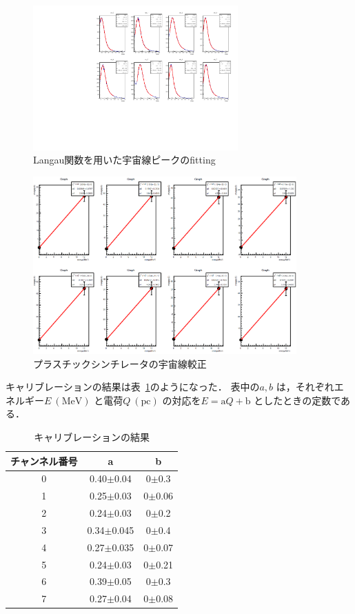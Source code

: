 \begin{figure}[H]
  \centering
  \includegraphics[width=0.7\textwidth,angle=-90]{figure/tajima/fit_langau.pdf}
  \caption{Langau関数を用いた宇宙線ピークのfitting}\label{ps_langau}
\end{figure} 
\begin{figure}[H]
  \centering
  \includegraphics[width=0.9\textwidth]{figure/tajima/fit_calibline.png}
  \caption{プラスチックシンチレータの宇宙線較正}\label{ps_cali}
\end{figure}

 キャリブレーションの結果は表~\ref{PS_calib_table}のようになった．
 表中の$a ,b$ は，それぞれエネルギー$E~(\mathrm{MeV })$ と電荷$Q~(\mathrm{pc })$ の対応を$E = \mathrm{a} Q + \mathrm{b}$ としたときの定数である．
 \begin{table}[h]
  \caption{キャリブレーションの結果}
  \label{PS_calib_table}
  \begin{center}
   \begin{tabular}{ccc}\toprule
    チャンネル番号&a &b \\ \hline
    0& 0.40$\pm$0.04 &0$\pm$0.3 \\
    1& 0.25$\pm$0.03 &0$\pm$0.06 \\
    2& 0.24$\pm$0.03 &0$\pm$0.2 \\
    3& 0.34$\pm$0.045 &0$\pm$0.4 \\
    4& 0.27$\pm$0.035 &0$\pm$0.07 \\
    5& 0.24$\pm$0.03 &0$\pm$0.21 \\
    6& 0.39$\pm$0.05 &0$\pm$0.3 \\
    7& 0.27$\pm$0.04 &0$\pm$0.08 \\ \bottomrule
   \end{tabular}
  \end{center}
 \end{table}%


